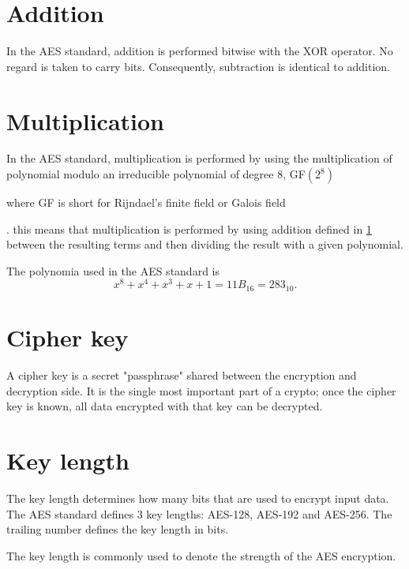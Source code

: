\documentclass[report.tex]{subfiles}
\begin{document}
\section{Addition}\label{sec:addition}
In the AES standard, addition is performed bitwise with the XOR operator. No regard is taken to carry bits. Consequently, subtraction is identical to addition.

\section{Multiplication}\label{sec:multiplication}
In the AES standard, multiplication is performed by using the multiplication of polynomial modulo an irreducible polynomial of degree 8, GF$\left(2^{8}\right)$ 
\begin{comment}
	\cite[Sec.~4.2]{AES Standard}
\end{comment}
where GF is short for Rijndael's finite field or Galois field 
\begin{comment}
	\cite{GF} page = http://en.wikipedia.org/wiki/Rijndael_Galois_field#Rijndael.27s_finite_field, date=2011-11-14
\end{comment}
. this means that multiplication is performed by using addition defined in \ref{sec:addition} between the resulting terms and then dividing the result with a given polynomial.

The polynomia used in the AES standard is
\begin{equation} \label{eq:multiplication polynomial}
	{x^{8} + x^{4} + x^{3} + x + 1} = 11B_{16} = 283_{10}.
\end{equation}


\section{Cipher key}
A cipher key is a secret "passphrase" shared between the encryption and decryption side. It is the single most important part of a crypto; once the cipher key is known, all data encrypted with that key can be decrypted.

\section{Key length} \label{sec:key length}
The key length determines how many bits that are used to encrypt input data. The AES standard defines 3 key lengths: AES-128, AES-192 and AES-256. The trailing number defines the key length in bits.

The key length is commonly used to denote the strength of the AES encryption.
\end{document}
